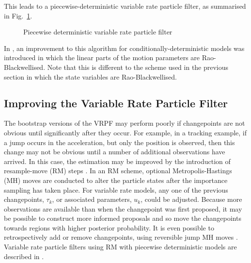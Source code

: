 \documentclass[peerreview,11pt,draftcls,onecolumn]{IEEEtran}
\begin{document}
This leads to a piecewise-deterministic variable rate particle filter, as summarised in Fig.~\ref{alg:VRPF}.

\begin{figure}
\caption{Piecewise deterministic variable rate particle filter}
\label{alg:VRPF}
\end{figure}

In \cite{Morelande2009a}, an improvement to this algorithm for conditionally-deterministic models was introduced in which the linear parts of the motion parameters are Rao-Blackwellised. Note that this is different to the scheme used in the previous section in which the state variables are Rao-Blackwellised.



\subsection{Improving the Variable Rate Particle Filter}

The bootstrap versions of the VRPF may perform poorly if changepoints are not obvious until significantly after they occur. For example, in a tracking example, if a jump occurs in the acceleration, but only the position is observed, then this change may not be obvious until a number of additional observations have arrived. In this case, the estimation may be improved by the introduction of resample-move (RM) steps \cite{Gilks2001}. In an RM scheme, optional Metropolis-Hastings (MH) moves are conducted to alter the particle states after the importance sampling has taken place. For variable rate models, any one of the previous changepoints, $\tau_k$, or associated parameters, $u_k$, could be adjusted. Because more observations are available than when the changepoint was first proposed, it may be possible to construct more informed proposals and so move the changepoints towards regions with higher posterior probability. It is even possible to retrospectively add or remove changepoints, using reversible jump MH moves \cite{Green1995}. Variable rate particle filters using RM with piecewise deterministic models are described in \cite{Whiteley2011,Gilholm2008}.
\end{document}
